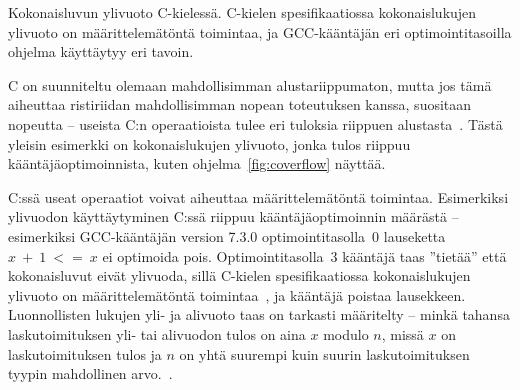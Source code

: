 
\FloatBarrier

\begin{listing}[ht!]
    \inputminted{C}{c-overflow.c}
    \inputminted{text}{c-overflow-output.txt}

    \caption{Kokonaisluvun ylivuoto C-kielessä. C-kielen
    spesifikaatiossa kokonaislukujen ylivuoto on määrittelemätöntä toimintaa,
    ja GCC-kääntäjän eri optimointitasoilla ohjelma käyttäytyy eri tavoin.}
    \label{fig:coverflow}
\end{listing}

\FloatBarrier

C on suunniteltu olemaan mahdollisimman alustariippumaton, mutta jos tämä
aiheuttaa ristiriidan mahdollisimman nopean toteutuksen kanssa, suositaan
nopeutta -- useista C:n operaatioista tulee eri tuloksia riippuen
alustasta~\citep[liite J, luku J.3]{C18}. Tästä yleisin esimerkki on
kokonaislukujen ylivuoto, jonka tulos riippuu kääntäjäoptimoinnista, kuten
ohjelma~\ref{fig:coverflow} näyttää.

C:ssä useat operaatiot voivat aiheuttaa määrittelemätöntä
toimintaa. Esimerkiksi ylivuodon käyttäytyminen
C:ssä riippuu kääntäjäoptimoinnin määrästä -- esimerkiksi GCC-kääntäjän version
7.3.0 optimointitasolla~0 lauseketta $x~+~1~<=~x$ ei optimoida pois.
Optimointitasolla~3 kääntäjä taas ''tietää'' että kokonaisluvut eivät ylivuoda,
sillä \mbox{C-kielen} spesifikaatiossa kokonaislukujen ylivuoto on
määrittelemätöntä toimintaa~\citep[liite J, luku J.2]{C18}, ja kääntäjä poistaa
lausekkeen. Luonnollisten lukujen yli- ja alivuoto taas on tarkasti määritelty
-- minkä tahansa laskutoimituksen yli- tai alivuodon tulos on aina $x$ modulo
$n$, missä $x$ on laskutoimituksen tulos ja $n$ on yhtä suurempi kuin suurin
laskutoimituksen tyypin mahdollinen arvo.~\citep[luku 6.2.5]{C18}.

